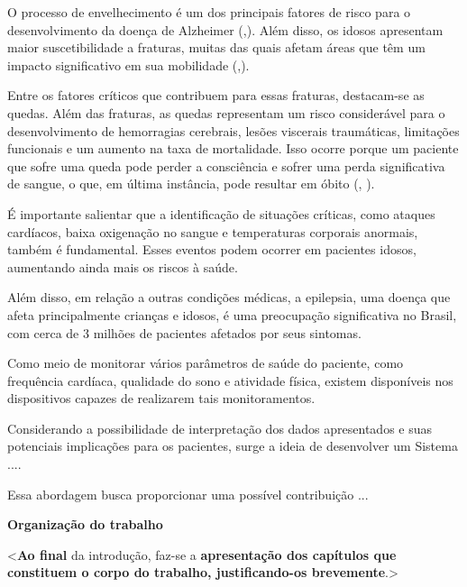 O processo de envelhecimento é um dos principais fatores de risco para o desenvolvimento da doença de Alzheimer (,\citeyear{AlzheimerAssociation}).  
Além disso, os idosos apresentam maior suscetibilidade a fraturas, muitas das quais afetam áreas que têm um impacto significativo em sua mobilidade (,\citeyear{PreventionFalls}). 

Entre os fatores críticos que contribuem para essas fraturas, destacam-se as quedas. Além das fraturas, as quedas representam um risco considerável para o desenvolvimento de hemorragias cerebrais, lesões viscerais traumáticas, limitações funcionais e um aumento na taxa de mortalidade. Isso ocorre porque um paciente que sofre uma queda pode perder a consciência e sofrer uma perda significativa de sangue, o que, em última instância, pode resultar em óbito (, \citeyear{PreventionFalls}).

É importante salientar que a identificação de situações críticas, como ataques cardíacos, baixa oxigenação no sangue e temperaturas corporais anormais, também é fundamental. Esses eventos podem ocorrer em pacientes idosos, aumentando ainda mais os riscos à saúde. 

Além disso, em relação a outras condições médicas, a epilepsia, uma doença que afeta principalmente crianças e idosos, é uma preocupação significativa no Brasil, com cerca de 3 milhões de pacientes afetados por seus sintomas. 

Como meio de monitorar vários parâmetros de saúde do paciente, como frequência cardíaca, qualidade do sono e atividade física, existem disponíveis nos dispositivos capazes de realizarem tais monitoramentos. 

Considerando a possibilidade de interpretação dos dados apresentados e suas potenciais implicações para os pacientes, surge a ideia de desenvolver um Sistema ....

Essa abordagem busca proporcionar uma possível contribuição ...

\vspace{0.5cm}
\textbf{Organização do trabalho}

\vspace{0.5cm}
<\textbf{Ao final} da introdução, faz-se a \textbf{apresentação dos capítulos que constituem o corpo do trabalho, justificando-os
brevemente}.>


